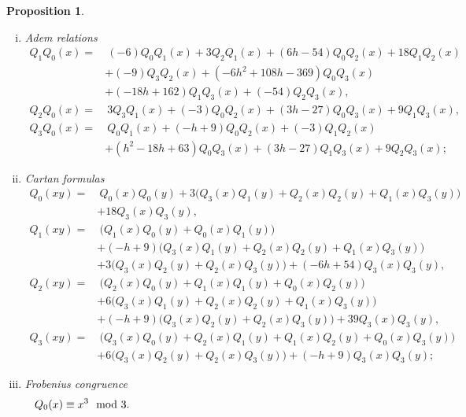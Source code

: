 \documentclass{gtpart}
\newtheorem{prop}[thm]{Proposition}
\theoremstyle{definition}
\theoremstyle{remark}
\newcommand{\md}{~~{\rm mod}~}
\begin{document}
\begin{prop}
\begin{enumerate}[(i)]
  \item {\em Adem relations} \label{Q(iv)}
  \begin{equation*}
  \begin{split}
   Q_1Q_0(x) = & ~ (-6) Q_0Q_1(x) + 3 Q_2Q_1(x) + (6 h - 54) Q_0Q_2(x) + 18 Q_1Q_2(x) \\
               & + (-9) Q_3Q_2(x) + (-6 h^2 + 108 h - 369) Q_0Q_3(x) \\
               & + (-18 h + 162) Q_1Q_3(x) + (-54) Q_2Q_3(x), \\
   Q_2Q_0(x) = & ~ 3 Q_3Q_1(x) + (-3) Q_0Q_2(x) + (3 h - 27) Q_0Q_3(x) + 9 Q_1Q_3(x), \qquad \qquad \\
   Q_3Q_0(x) = & ~ Q_0Q_1(x) + (-h + 9) Q_0Q_2(x) + (-3) Q_1Q_2(x) \\
               & + (h^2 - 18 h + 63) Q_0Q_3(x) + (3 h - 27) Q_1Q_3(x) + 9 Q_2Q_3(x); 
  \end{split}
  \end{equation*}

  \item {\em Cartan formulas} \label{Q(v)}
  \begin{equation*}
  \begin{split}
   Q_0(xy) = & ~ Q_0(x) Q_0(y) + 3 \big( Q_3(x) Q_1(y) + Q_2(x) Q_2(y) + Q_1(x) Q_3(y) \big) \\
             & + 18 Q_3(x) Q_3(y), \\
   Q_1(xy) = & ~ \big( Q_1(x) Q_0(y) + Q_0(x) Q_1(y) \big) \\
             & + (-h + 9) \big( Q_3(x) Q_1(y) + Q_2(x) Q_2(y) + Q_1(x) Q_3(y) \big) \\
             & + 3 \big( Q_3(x) Q_2(y) + Q_2(x) Q_3(y) \big) + (-6 h + 54) Q_3(x) Q_3(y), \qquad \qquad \qquad
  \end{split}
  \end{equation*}
  \begin{equation*}
  \begin{split}
   Q_2(xy) = & ~ \big( Q_2(x) Q_0(y) + Q_1(x) Q_1(y) + Q_0(x) Q_2(y) \big) \\
             & + 6 \big( Q_3(x) Q_1(y) + Q_2(x) Q_2(y) + Q_1(x) Q_3(y) \big) \\
             & + (-h + 9) \big( Q_3(x) Q_2(y) + Q_2(x) Q_3(y) \big) + 39 Q_3(x) Q_3(y), \\
   Q_3(xy) = & ~ \big( Q_3(x) Q_0(y) + Q_2(x) Q_1(y) + Q_1(x) Q_2(y) + Q_0(x) Q_3(y) \big) \qquad \qquad \qquad \\
             & + 6 \big( Q_3(x) Q_2(y) + Q_2(x) Q_3(y) \big) + (-h + 9) Q_3(x) Q_3(y); 
  \end{split}
  \end{equation*}

  \item {\em Frobenius congruence} \label{Q(vi)}
  \begin{equation*}
   Q_0(x) \equiv x^3 \md 3.  \qquad \qquad \qquad \qquad \qquad \qquad \qquad \qquad \qquad \qquad \qquad \qquad
  \end{equation*}
 \end{enumerate}
\end{prop}
\end{document}
